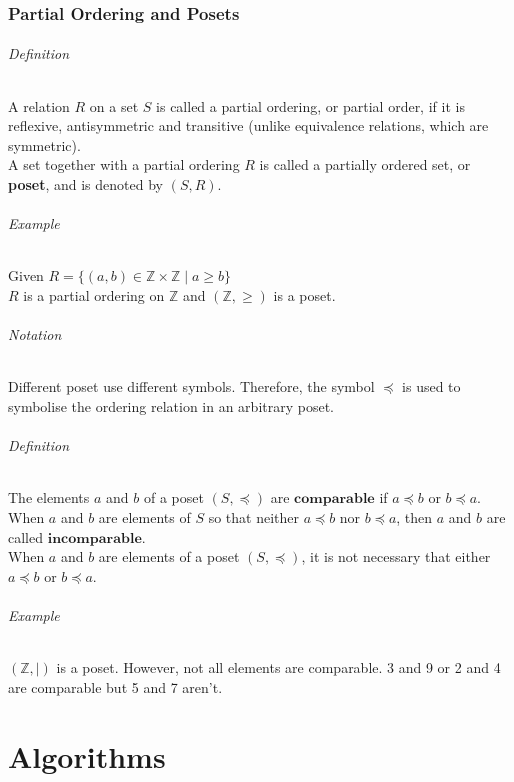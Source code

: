\documentclass[10pt,a4paper]{book}
\begin{document}
\section{Partial Ordering and Posets}
\paragraph*{Definition}
A relation $R$ on a set $S$ is called a partial ordering, or partial order, if it is reflexive, antisymmetric and transitive (unlike equivalence relations, which are symmetric).\\
A set together with a partial ordering $R$ is called a partially ordered set, or \textbf{poset}, and is denoted by $(S,R)$.
\paragraph*{Example}
Given $R = \{(a,b) \in \mathbb{Z} \times \mathbb{Z} \mid a \geqslant b \}$\\
$R$ is a partial ordering on $\mathbb{Z}$ and $(\mathbb{Z}, \geqslant)$ is a poset.
\paragraph*{Notation}
Different poset use different symbols. Therefore, the symbol $\preceq$ is used to symbolise the ordering relation in an arbitrary poset.
\paragraph*{Definition}
The elements $a$ and $b$ of a poset $(S,\preceq)$ are $\mathbf{comparable}$ if $a \preceq b$ or $b \preceq a$.\\
When $a$ and $b$ are elements of $S$ so that neither $a \preceq b$ nor $b \preceq a$, then $a$ and $b$ are called $\mathbf{incomparable}$.\\
When $a$ and $b$ are elements of a poset $(S,\preceq)$, it is not necessary that either $a \preceq b$ or $b \preceq a$.
\paragraph*{Example}
$(\mathbb{Z},|)$ is a poset. However, not all elements are comparable. 3 and 9 or 2 and 4 are comparable but 5 and 7 aren't.

\part{Algorithms}
\end{document}
